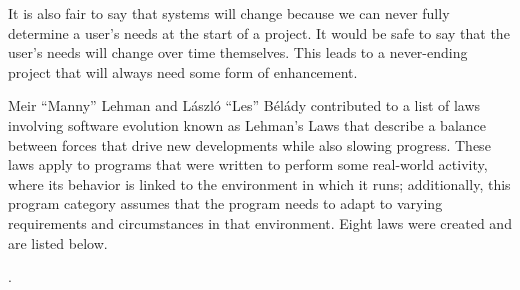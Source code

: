It is also fair to say that systems will change because we can never fully determine a user's needs at the start of a project. It would be safe to say that the user's needs will change over time themselves. This leads to a never-ending project that will always need some form of enhancement.

Meir ``Manny'' Lehman and László ``Les'' Bélády contributed to a list of laws involving software evolution known as Lehman's Laws that describe a balance between forces that drive new developments while also slowing progress. These laws apply to programs that were written to perform some real-world activity, where its behavior is linked to the environment in which it runs; additionally, this program category assumes that the program needs to adapt to varying requirements and circumstances in that environment. Eight laws were created and are listed below. \cite{wiki:lehmans-laws}

.

